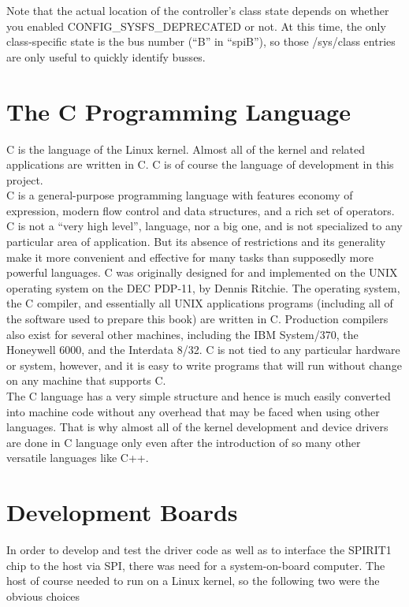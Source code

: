 Note that the actual location of the controller's class state depends on whether you enabled CONFIG\_SYSFS\_DEPRECATED or not.  At this time, the only class-specific state is the bus number (``B'' in ``spiB''), so those /sys/class entries are only useful to quickly identify busses.
\section{The C Programming Language}
C is the language of the Linux kernel. Almost all of the kernel and related applications are written in C. C is of course the language of development in this project.\\
C is a general-purpose programming language with features economy of expression, modern flow control and data structures, and a rich set of operators. C is not a ``very high level'', language, nor a big one, and is not specialized to any particular area of application. But its absence of restrictions and its generality make it more convenient and effective for many tasks than supposedly more powerful languages. C was originally designed for and implemented on the UNIX operating system on the DEC PDP-11, by Dennis Ritchie. The operating system, the C compiler, and essentially all UNIX applications programs (including all of the software used to prepare this book) are written in C. Production compilers also exist for several other machines, including the IBM System/370, the Honeywell 6000, and the Interdata 8/32. C is not tied to any particular hardware or system, however, and it is easy to write programs that will run without change on any machine that supports C.\\
The C language has a very simple structure and hence is much easily converted into machine code without any overhead that may be faced when using other languages. That is why almost all of the kernel development and device drivers are done in C language only even after the introduction of so many other versatile languages like C++.
\section{Development Boards}
In order to develop and test the driver code as well as to interface the SPIRIT1 chip to the host via SPI, there was need for a system-on-board computer. The host of course needed to run on a Linux kernel, so the following two were the obvious choices
